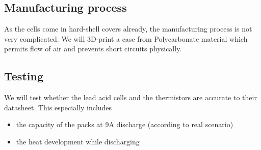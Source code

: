 \subsection{Manufacturing process}
As the cells come in hard-shell covers already, the manufacturing process is not very complicated. We will 3D-print a case from Polycarbonate material which permits flow of air and prevents short circuits physically.

\subsection{Testing}
We will test whether the lead acid cells and the thermistors are accurate to their datasheet. This especially includes \begin{itemize}
    \item the capacity of the packs at 9A discharge (according to real scenario)
    \item the heat development while discharging
\end{itemize}
